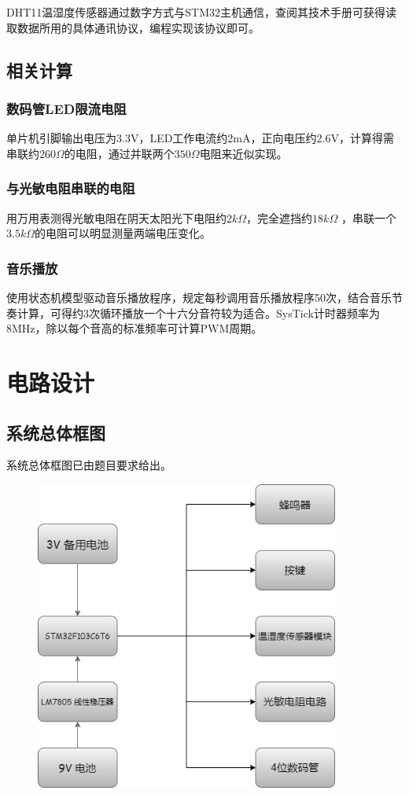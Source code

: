 \documentclass[a4paper,11pt,UTF8]{ctexart}
\newcommand{\bottomcaption}{%
\setlength{\abovecaptionskip}{6bp}%
\setlength{\belowcaptionskip}{6bp}%
\caption}
\newcommand{\xiaowuhao}{\fontsize{9bp}{9bp}\selectfont}   %
\begin{document}
DHT11温湿度传感器通过数字方式与STM32主机通信，查阅其技术手册可获得读取数据所用的具体通讯协议，编程实现该协议即可。

\subsection{相关计算}

\subsubsection{数码管LED限流电阻}

单片机引脚输出电压为3.3V，LED工作电流约2mA，正向电压约2.6V，计算得需串联约$260\Omega$的电阻，通过并联两个$350\Omega$电阻来近似实现。

\subsubsection{与光敏电阻串联的电阻}

用万用表测得光敏电阻在阴天太阳光下电阻约$2k\Omega$，完全遮挡约$18k\Omega$ ，串联一个$3.5k\Omega$的电阻可以明显测量两端电压变化。

\subsubsection{音乐播放}

使用状态机模型驱动音乐播放程序，规定每秒调用音乐播放程序50次，结合音乐节奏计算，可得约3次循环播放一个十六分音符较为适合。SysTick计时器频率为8MHz，除以每个音高的标准频率可计算PWM周期。

\section{电路设计}

\subsection{系统总体框图}

系统总体框图已由题目要求给出。

\begin{figure}[!htbp]
    \centering
    \includegraphics[width=10cm]{image1.png}
    \bottomcaption{\xiaowuhao{系统总体框图}}
\end{figure}
\end{document}
